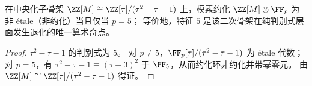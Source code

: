 \begin{corollary}[判别式锁定的唯一坏素数：\texorpdfstring{$p=5$}{p=5} 的骨架退化]\label{cor:pom-centralizer-unique-bad-prime-5}
在中央化子骨架 \(\ZZ[M]\cong \ZZ[\tau]/(\tau^2-\tau-1)\) 上，模素约化 \(\ZZ[M]\otimes\FF_p\) 为非 \'{e}tale（非约化）当且仅当 \(p=5\)；
等价地，特征 \(5\) 是该二次骨架在纯判别式层面发生退化的唯一算术奇点。
\end{corollary}
\begin{proof}
\(\tau^2-\tau-1\) 的判别式为 \(5\)。
对 \(p\neq 5\)，\(\FF_p[\tau]/(\tau^2-\tau-1)\) 为 \'{e}tale 代数；
对 \(p=5\)，有 \(\tau^2-\tau-1\equiv(\tau-3)^2\) 于 \(\FF_5\)，从而约化环非约化并带幂零元。
由 \(\ZZ[M]\cong \ZZ[\tau]/(\tau^2-\tau-1)\) 得证。
\end{proof}
